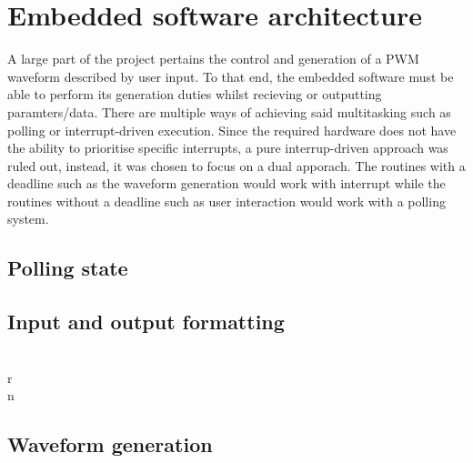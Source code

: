 \section{Embedded software architecture}
A large part of the project pertains the control and generation of a PWM waveform described by
user input. To that end, the embedded software must be able to perform its generation duties whilst
recieving or outputting paramters/data. There are multiple ways of achieving said multitasking such as
polling or interrupt-driven execution. Since the required hardware does not have the ability to prioritise
specific interrupts, a pure interrup-driven approach was ruled out, instead, it was chosen to focus on a dual apporach. The routines with a deadline such as the waveform generation would work with interrupt while the routines without a deadline such as user interaction would work with a polling system.

    \subsection{Polling state}
    
    \subsection{Input and output formatting}
    \\r\\n

    \subsection{Waveform generation}